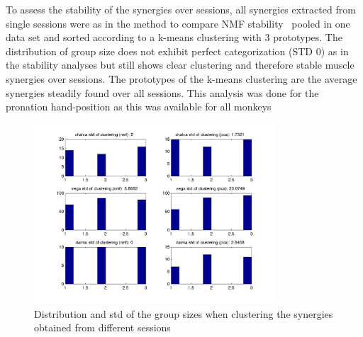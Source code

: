 To assess the stability of the synergies over sessions, all synergies extracted from single sessions were as in the method to compare NMF stability~ pooled in one data set and sorted according to a k-means clustering with 3 prototypes. The distribution of group size does not exhibit perfect categorization (STD 0) as in the stability analyses but still shows clear clustering and therefore stable muscle synergies over sessions. The prototypes of the k-means clustering are the average synergies steadily found over all sessions. This analysis was done for the pronation hand-position as this was available for all monkeys


\begin{figure}[ht]
    \centering
    \includegraphics[width=0.8\textwidth]{images/syn_consist_sessions_std.jpg}
    \caption{Distribution and std of the group sizes when clustering the synergies obtained from different sessions}
    \label{sg:fig:images_syn_consist_sessions_std}
\end{figure}



